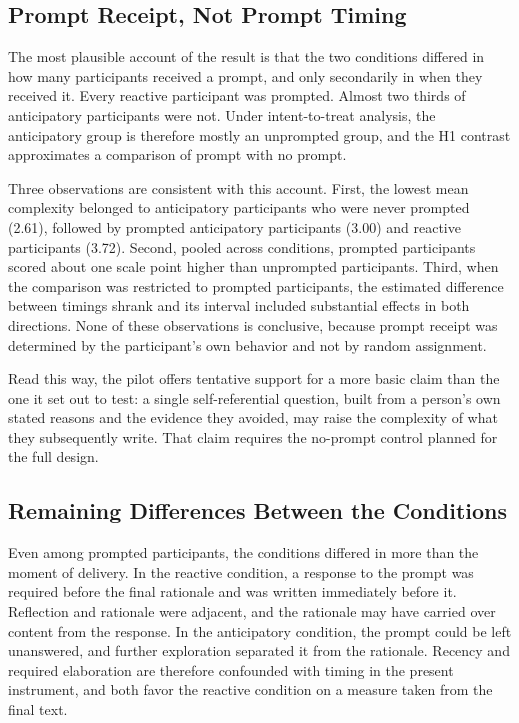 \documentclass[12pt,letterpaper]{article}
\begin{document}
\subsection{Prompt Receipt, Not Prompt Timing}
The most plausible account of the result is that the two conditions differed in how many participants received a prompt, and only secondarily in when they received it. Every reactive participant was prompted. Almost two thirds of anticipatory participants were not. Under intent-to-treat analysis, the anticipatory group is therefore mostly an unprompted group, and the H1 contrast approximates a comparison of prompt with no prompt.

Three observations are consistent with this account. First, the lowest mean complexity belonged to anticipatory participants who were never prompted (2.61), followed by prompted anticipatory participants (3.00) and reactive participants (3.72). Second, pooled across conditions, prompted participants scored about one scale point higher than unprompted participants. Third, when the comparison was restricted to prompted participants, the estimated difference between timings shrank and its interval included substantial effects in both directions. None of these observations is conclusive, because prompt receipt was determined by the participant's own behavior and not by random assignment.

Read this way, the pilot offers tentative support for a more basic claim than the one it set out to test: a single self-referential question, built from a person's own stated reasons and the evidence they avoided, may raise the complexity of what they subsequently write. That claim requires the no-prompt control planned for the full design.

\subsection{Remaining Differences Between the Conditions}
Even among prompted participants, the conditions differed in more than the moment of delivery. In the reactive condition, a response to the prompt was required before the final rationale and was written immediately before it. Reflection and rationale were adjacent, and the rationale may have carried over content from the response. In the anticipatory condition, the prompt could be left unanswered, and further exploration separated it from the rationale. Recency and required elaboration are therefore confounded with timing in the present instrument, and both favor the reactive condition on a measure taken from the final text.
\end{document}
